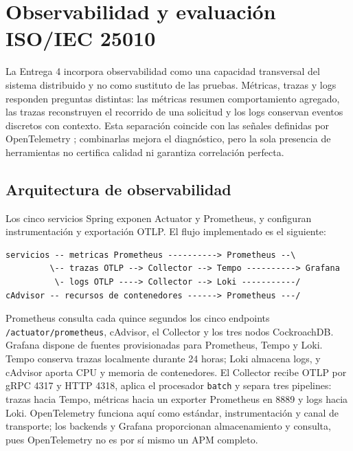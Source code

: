 \section{Observabilidad y evaluación ISO/IEC 25010}
\label{sec:observabilidad-iso}

La Entrega 4 incorpora observabilidad como una capacidad transversal del
sistema distribuido y no como sustituto de las pruebas. Métricas, trazas y logs
responden preguntas distintas: las métricas resumen comportamiento agregado,
las trazas reconstruyen el recorrido de una solicitud y los logs conservan
eventos discretos con contexto. Esta separación coincide con las señales
definidas por OpenTelemetry \cite{opentelemetry2026signals}; combinarlas mejora
el diagnóstico, pero la sola presencia de herramientas no certifica calidad ni
garantiza correlación perfecta.

\subsection{Arquitectura de observabilidad}
\label{subsec:arquitectura-observabilidad}

Los cinco servicios Spring exponen Actuator y Prometheus, y configuran
instrumentación y exportación OTLP. El flujo implementado es el siguiente:

\begin{center}
\begin{verbatim}
servicios -- metricas Prometheus ----------> Prometheus --\
         \-- trazas OTLP --> Collector --> Tempo ----------> Grafana
          \- logs OTLP ----> Collector --> Loki -----------/
cAdvisor -- recursos de contenedores ------> Prometheus ---/
\end{verbatim}
\end{center}

Prometheus consulta cada quince segundos los cinco endpoints
\texttt{/actuator/prometheus}, cAdvisor, el Collector y los tres nodos
CockroachDB. Grafana dispone de fuentes provisionadas para Prometheus, Tempo y
Loki. Tempo conserva trazas localmente durante 24 horas; Loki almacena logs, y
cAdvisor aporta CPU y memoria de contenedores. El Collector recibe OTLP por
gRPC 4317 y HTTP 4318, aplica el procesador \texttt{batch} y separa tres
pipelines: trazas hacia Tempo, métricas hacia un exporter Prometheus en 8889 y
logs hacia Loki. OpenTelemetry funciona aquí como estándar, instrumentación y
canal de transporte; los backends y Grafana proporcionan almacenamiento y
consulta, pues OpenTelemetry no es por sí mismo un APM completo.


